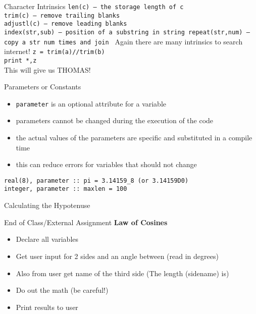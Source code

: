 \documentclass{beamer}
\begin{document}
\begin{frame}{Character Intrinsics}
\texttt{len(c) -- the storage length of c\\
  trim(c) -- remove trailing blanks\\
  adjustl(c) -- remove leading blanks\\
  index(str,sub) -- position of a substring in string
  repeat(str,num) -- copy a str num times and join
}
\vfill Again there are many intrinsics to search internet!
\vfill
\texttt{z = trim(a)//trim(b)} \\
\texttt{print *,z} \\
\vfill
This will give us THOMAS!
\end{frame}
\begin{frame}{Parameters or Constants}
  \begin{itemize}
    \item \texttt{parameter} is an optional attribute for a variable
    \vfill\item parameters cannot be changed during the execution of the code
    \vfill\item the actual values of the parameters are specific and substituted in a compile time
    \vfill\item this can reduce errors for variables that should not change
  \end{itemize}
\vfill
\texttt{real(8), parameter :: pi = 3.14159\_8 (or 3.14159D0) \\
	integer, parameter :: maxlen = 100}
\end{frame}
\begin{frame}[allowframebreaks]{Calculating the Hypotenuse}
\begin{scriptsize}
  
\end{scriptsize}
\end{frame}
\begin{frame}{End of Class/External Assignment}
\center\Large\textbf{Law of Cosines}
\normalsize
\begin{itemize}
  \vfill\item Declare all variables
  \vfill\item Get user input for 2 sides and an angle between (read in degrees)
  \vfill\item Also from user get name of the third side (The length (sidename) is)
  \vfill\item Do out the math (be careful!)
  \vfill\item Print results to user
\end{itemize}
\end{frame}
\end{document}
